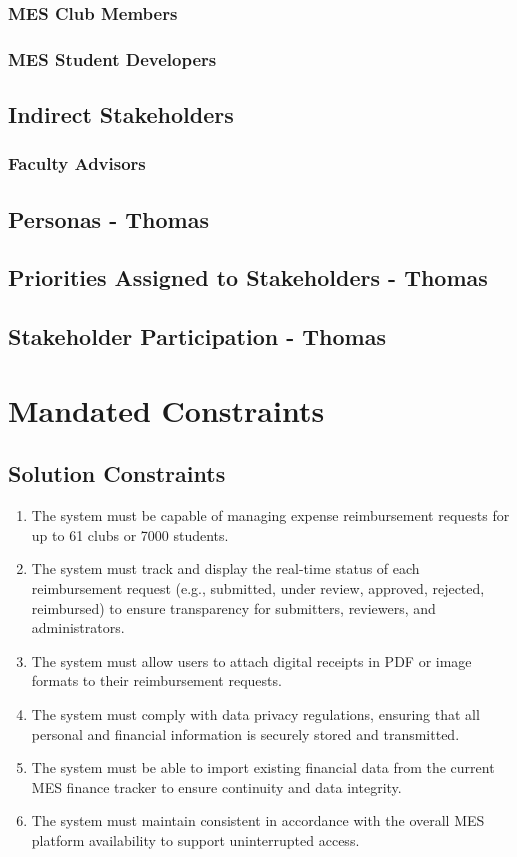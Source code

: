 \documentclass[12pt]{article}
\begin{document}
    \subsubsection{MES Club Members}
    \subsubsection{MES Student Developers}

  \subsection{Indirect Stakeholders}
    \subsubsection{Faculty Advisors}

  \subsection{Personas - Thomas}
  \subsection{Priorities Assigned to Stakeholders - Thomas}
  \subsection{Stakeholder Participation - Thomas}


\section{Mandated Constraints}


\subsection{Solution Constraints}
  \begin{enumerate}
    \item The system must be capable of managing expense reimbursement requests for up to 61 clubs or 7000 students.
    \item The system must track and display the real-time status of each reimbursement request (e.g., submitted, under review, approved, rejected, reimbursed) to ensure transparency for submitters, reviewers, and administrators.
    \item The system must allow users to attach digital receipts in PDF or image formats to their reimbursement requests.
    \item The system must comply with data privacy regulations, ensuring that all personal and financial information is securely stored and transmitted.
    \item The system must be able to import existing financial data from the current MES finance tracker to ensure continuity and data integrity.
    \item The system must maintain consistent in accordance with the overall MES platform availability to support uninterrupted access.
  \end{enumerate}
\end{document}
